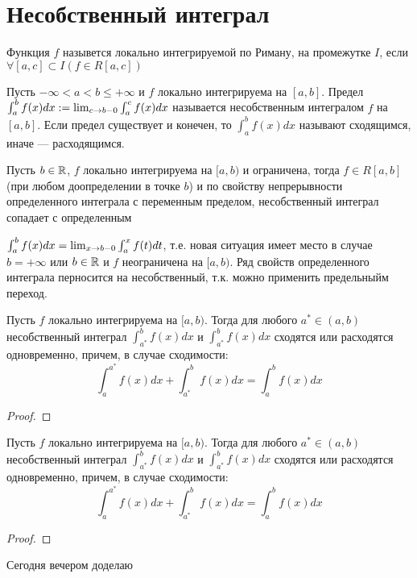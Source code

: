 \section{Несобственный интеграл}
\begin{definition}
    Функция $f$ назывется локально интегрируемой по Риману, на промежутке $I$, если $\forall [a, c] \subset I (f \in R[a, c])$
\end{definition}

\begin{definition}
    Пусть $-\infty < a < b \le +\infty$ и $f$ локально интегрируема на $[a, b]$. Предел $\int_a^b f(x)dx := \lim_{c \rightarrow b - 0}\int_{a}^{c}f(x)dx$ называется несобственным интегралом $f$ на $[a, b]$. Если предел существует и конечен, то $\int_{a}^{b}f(x)dx$ называют сходящимся, иначе --- расходящимся.
\end{definition}

Пусть $b \in \mathbb{R}$, $f$ локально интегрируема на $[a, b)$ и ограничена, тогда $f \in R[a, b]$ (при любом доопределении в точке $b$) и по свойству непрерывности определенного интеграла с переменным пределом, несобственный интеграл сопадает с определенным

$\int_{a}^{b}f(x)dx = \lim_{x \rightarrow b - 0} \int_{a}^{x}f(t)dt$, т.е. новая ситуация имеет место в случае $b = +\infty$ или $b \in \mathbb{R}$ и $f$ неограничена на $[a, b)$. Ряд свойств определенного интеграла перносится на несобственный, т.к. можно применить предельныйм переход.

\begin{proposition}
    Пусть $f$ локально интегрируема на $[a, b)$. Тогда для любого $a^* \in (a, b)$ несобственный интеграл $\int_{a^*}^{b}f(x)dx$ и $\int_{a^*}^{b}f(x)dx$ сходятся или расходятся одновременно, причем, в случае сходимости:
    $$\int_{a}^{a^*}f(x)dx + \int_{a^*}^{b}f(x)dx = \int_{a}^{b}f(x)dx$$
\end{proposition}
\begin{proof}
    
\end{proof}

\begin{proposition}[Линейность]
    Пусть $f$ локально интегрируема на $[a, b)$. Тогда для любого $a^* \in (a, b)$ несобственный интеграл $\int_{a^*}^{b}f(x)dx$ и $\int_{a^*}^{b}f(x)dx$ сходятся или расходятся одновременно, причем, в случае сходимости:
    $$\int_{a}^{a^*}f(x)dx + \int_{a^*}^{b}f(x)dx = \int_{a}^{b}f(x)dx$$
\end{proposition}
\begin{proof}
    
\end{proof}

Сегодня вечером доделаю